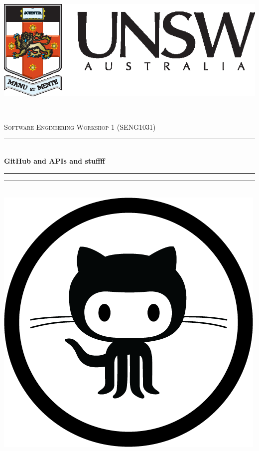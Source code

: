 \documentclass[12pt]{article}
\begin{document}
~\\[1cm]
\begin{center}
\includegraphics[scale=0.7]{landscapeColourPos.eps}
\end{center}
~\\[1cm]
\begin{center}

\textsc{\Large Software Engineering Workshop 1 (SENG1031)}\\[0.5cm]

\hrule $~$\\[0.4cm]
{ \huge \bfseries GitHub and APIs and stuffff \\[1cm]}
\hrule \hrule $~$\\[1.5cm]

\includegraphics[scale=0.2]{github_icon}~\\[1cm]


\end{center}
\end{document}
